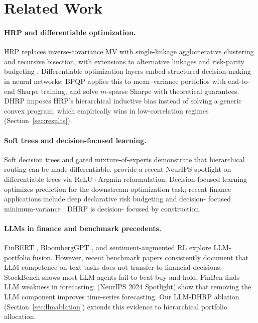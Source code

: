 \section{Related Work}
\label{sec:related}

\paragraph{HRP and differentiable optimization.}
HRP \citep{LopezdePrado2016} replaces inverse-covariance MV with
single-linkage agglomerative clustering and recursive bisection, with
extensions to alternative linkages \citep{Raffinot2018} and risk-parity
budgeting \citep{Roncalli2013}. Differentiable optimization layers
\citep{Amos2017,Agrawal2019,Bolte2021} embed structured decision-making
in neural networks; BPQP \citep{Pan2024BPQP} applies this to mean--variance
portfolios with end-to-end Sharpe training, and \citet{Lin2024MSparse}
solve $m$-sparse Sharpe with theoretical guarantees. DHRP imposes
HRP's hierarchical inductive bias instead of solving a generic convex
program, which empirically wins in low-correlation regimes
(Section~\ref{sec:results}).

\paragraph{Soft trees and decision-focused learning.}
Soft decision trees \citep{FrosstHinton2017,Popov2020NODE,Hazimeh2020TreeEnsemble}
and gated mixture-of-experts \citep{Shazeer2017} demonstrate that
hierarchical routing can be made differentiable. \citet{Mao2025DiffTree}
provide a recent NeurIPS spotlight on differentiable trees via
ReLU+Argmin reformulation. Decision-focused learning
\citep{Wilder2019,Elmachtoub2022SPO,Donti2017} optimizes prediction for
the downstream optimization task; recent finance applications include
deep declarative risk budgeting \citep{ParraDiaz2025} and decision-
focused minimum-variance \citep{KimLee2025DFL}. DHRP is decision-
focused by construction.

\paragraph{LLMs in finance and benchmark precedents.}
FinBERT \citep{Huang2023}, BloombergGPT \citep{Wu2023BloombergGPT}, and
sentiment-augmented RL \citep{Kirtac2025} explore LLM-portfolio fusion.
However, recent benchmark papers consistently document that LLM
competence on text tasks does not transfer to financial decisions:
StockBench \citep{Chen2025StockBench} shows most LLM agents fail to
beat buy-and-hold; FinBen \citep{Xie2024FinBen} finds LLM weakness in
forecasting; \citet{Tan2024AreLMs} (NeurIPS 2024 Spotlight) show that
removing the LLM component improves time-series forecasting. Our
LLM-DHRP ablation (Section~\ref{sec:llmablation}) extends this evidence
to hierarchical portfolio allocation.

